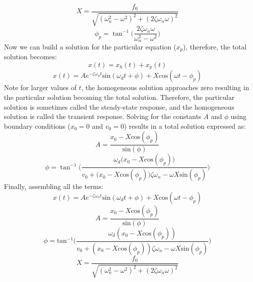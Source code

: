 \documentclass[12pt,letter]{article}
\begin{document}
	\begin{equation}
		X = \frac{f_0}{\sqrt{(\omega_n^2 - \omega^2)^2 +  (2\zeta \omega_n \omega)^2}} 
		\label{eq:X_damped}
	\end{equation}	
	\begin{equation}
		\phi_p = \tan^{-1} \bigg(\frac{2\zeta \omega_n \omega}{\omega_n^2 - \omega^2}\bigg)
	\end{equation}				
	Now we can build a solution for the particular equation ($x_p$), therefore, the total solution becomes:
	\begin{equation}
		x(t) = x_h(t) + x_p(t)
	\end{equation}
	\begin{equation}
		x(t) = Ae^{-\zeta \omega_n t}\text{sin}(\omega_d t + \phi) +  X \text{cos}(\omega t - \phi_p)
	\end{equation}				
	Note for larger values of $t$, the homogeneous solution approaches zero resulting in the particular solution becoming the total solution. Therefore, the particular solution is sometimes called the steady-state response, and the homogeneous solution is called the transient response. Solving for the constants $A$ and $\phi$ using boundary conditions ($x_0=0$ and $v_0=0$) results in a total solution expressed as:
	\begin{equation}
		A = \frac{x_0 -X \text{cos}(\phi_p)}{\text{sin}(\phi)}
	\end{equation}			 
	\begin{equation}
		\phi =  \tan^{-1} \bigg(\frac{\omega_d \big( x_0 -X \text{cos}(\phi_p)\big)}{v_0 + \big(x_0 - X \text{cos}(\phi_p)\big) \zeta \omega_n - \omega X \text{sin}(\phi_p) }\bigg)
	\end{equation}			
	Finally, assembling all the terms:
	\begin{equation}
		x(t) = Ae^{-\zeta \omega_n t}\text{sin}(\omega_d t + \phi) +  X \text{cos}(\omega t - \phi_p)
		\label{eq:damped_forced_x}
	\end{equation}
	\begin{equation}
		A = \frac{x_0 -X \text{cos}(\phi_p)}{\text{sin}(\phi)}
	\end{equation}			 
	\begin{equation}
		\phi =  \text{tan}^{-1}\bigg(\frac{\omega_d ( x_0 -X \text{cos}(\phi_p))}{v_0 + (x_0 - X \text{cos}(\phi_p)) \zeta \omega_n - \omega X \text{sin}(\phi_p) }\bigg)
	\end{equation}	
	\begin{equation}
		X = \frac{f_0}{\sqrt{(\omega_n^2 - \omega^2)^2 +  (2\zeta \omega_n \omega)^2}} 
	\end{equation}	
\end{document}
